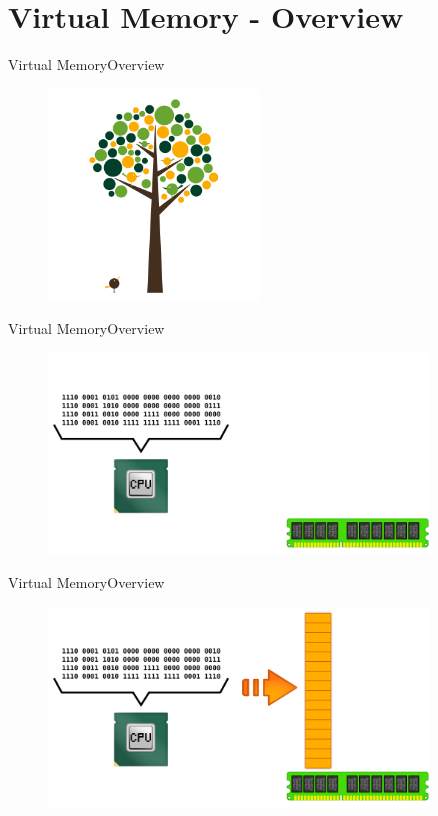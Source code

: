 \documentclass[10pt]{beamer}
\begin{document}
\section{Virtual Memory - Overview}
\begin{frame}{Virtual Memory}{Overview}
  \begin{figure}[ht]
    \centering
    \includegraphics[width=0.5\textwidth, keepaspectratio=true]{images/concepts.png}
  \end{figure}
\end{frame}


\begin{frame}{Virtual Memory}{Overview}
  \begin{figure}[ht]
    \centering
    \includegraphics[width=0.9\textwidth, keepaspectratio=true]{images/virtual_memory_a.png}
  \end{figure}
\end{frame}

\begin{frame}{Virtual Memory}{Overview}
  \begin{figure}[ht]
    \centering
    \includegraphics[width=0.9\textwidth, keepaspectratio=true]{images/virtual_memory_b.png}
  \end{figure}
\end{frame}
\end{document}
